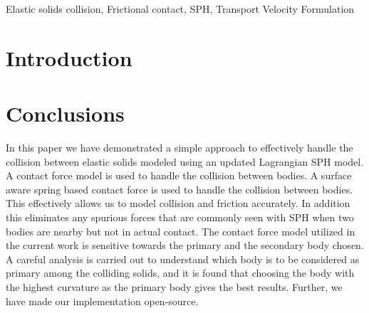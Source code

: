 \documentclass[preprint,12pt]{elsarticle}
\begin{document}
\begin{frontmatter}

  \title{}
  \author[IITB]{Dinesh Adepu}
  \author[University of Surrey]{Chuan Yu Wu}
\address[UoS]{Department of Aerospace Engineering, Indian Institute of
  Technology Bombay, Powai, Mumbai 400076}



\begin{abstract}

\end{abstract}

\begin{keyword}
{Elastic solids collision}, {Frictional contact}, {SPH}, {Transport Velocity Formulation}


\end{keyword}

\end{frontmatter}


\section{Introduction}
\label{sec:intro}




\FloatBarrier%
\section{Conclusions}
\label{sec:conclusions}

In this paper we have demonstrated a simple approach to effectively handle the
collision between elastic solids modeled using an updated Lagrangian SPH
model. A contact force model is used to handle the collision between bodies. A
surface aware spring based contact force is used to handle the collision
between bodies. This effectively allows us to model collision and friction
accurately. In addition this eliminates any spurious forces that are commonly
seen with SPH when two bodies are nearby but not in actual contact. The
contact force model utilized in the current work is sensitive towards the
primary and the secondary body chosen. A careful analysis is carried out to
understand which body is to be considered as primary among the colliding
solids, and it is found that choosing the body with the highest curvature as
the primary body gives the best results. Further, we have made our
implementation open-source.
\end{document}
